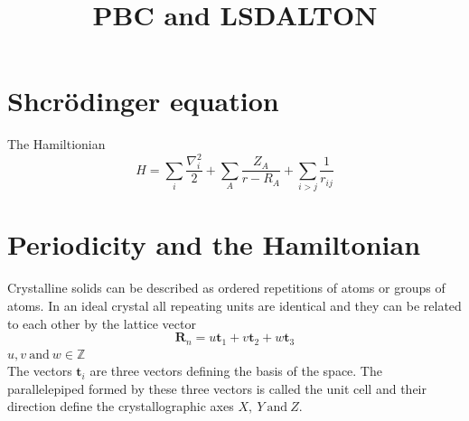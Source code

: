\documentclass[12pt,a4paper,english]{beamer}
\title{PBC and LSDALTON}
\newcommand{\mbf}{ \mathbf }
\begin{document}
\date{}
\frame{\titlepage}

\section{Shcr\"odinger equation}
\begin{frame}
  The Hamiltionian
  \begin{equation}
	H= \sum_i \frac{\nabla^2_i}{2} + \sum_{A}\frac{Z_A}{r-R_A}+\sum_{i>j}\frac{1}{r_{ij}}
	\label{eq:ham}
  \end{equation}

\end{frame}

\section{Periodicity and the Hamiltonian}

\begin{frame}
 Crystalline solids can be described as ordered repetitions of atoms or groups
 of atoms. In an ideal crystal all repeating units are 
 identical and they can be related to each other by the lattice vector
 \begin{equation*}
   \mbf R_n= u\mbf t_1 + v\mbf t_2 + w\mbf t_3
 \end{equation*}
 $u,v~\mbox{and}~w\in \mathbb{Z}$
%
\\ The vectors $\mbf t_i$ are three vectors defining the
 basis of the space.
 The parallelepiped formed by these three vectors is called the unit cell and
 their direction define the crystallographic axes $X,~Y~\mbox{and}~Z$.
\end{frame}

\end{document}
